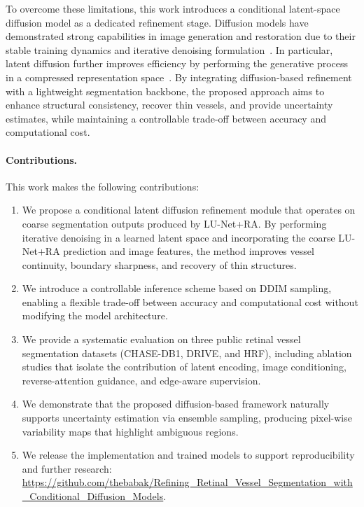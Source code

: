 \documentclass[journal,article,submit,pdftex,moreauthors]{Definitions/mdpi}
\begin{document}
To overcome these limitations, this work introduces a conditional latent-space diffusion model as a dedicated refinement stage. Diffusion models have demonstrated strong capabilities in image generation and restoration due to their stable training dynamics and iterative denoising formulation~\cite{Ho2020, Dhariwal2021}. In particular, latent diffusion further improves efficiency by performing the generative process in a compressed representation space~\cite{Rombach2022}. By integrating diffusion-based refinement with a lightweight segmentation backbone, the proposed approach aims to enhance structural consistency, recover thin vessels, and provide uncertainty estimates, while maintaining a controllable trade-off between accuracy and computational cost.

\paragraph{Contributions.}
This work makes the following contributions:

\begin{enumerate}
  \item We propose a conditional latent diffusion refinement module that operates on coarse segmentation outputs produced by LU-Net+RA. By performing iterative denoising in a learned latent space and incorporating the coarse LU-Net+RA prediction and image features, the method improves vessel continuity, boundary sharpness, and recovery of thin structures.

  \item We introduce a controllable inference scheme based on DDIM sampling, enabling a flexible trade-off between accuracy and computational cost without modifying the model architecture.

  \item We provide a systematic evaluation on three public retinal vessel segmentation datasets (CHASE-DB1, DRIVE, and HRF), including ablation studies that isolate the contribution of latent encoding, image conditioning, reverse-attention guidance, and edge-aware supervision.

  \item We demonstrate that the proposed diffusion-based framework naturally supports uncertainty estimation via ensemble sampling, producing pixel-wise variability maps that highlight ambiguous regions.

  \item We release the implementation and trained models to support reproducibility and further research: \url{https://github.com/thebabak/Refining_Retinal_Vessel_Segmentation_with_Conditional_Diffusion_Models}.
\end{enumerate}
\end{document}
